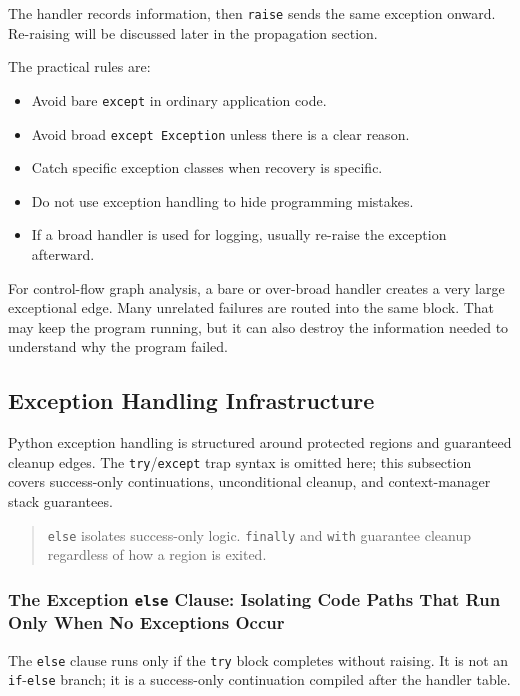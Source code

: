 \documentclass[a4paper,twoside]{report}
\begin{document}
The handler records information, then \texttt{raise} sends the same exception onward. Re-raising will be discussed later in the propagation section.

The practical rules are:

\begin{itemize}
    \item Avoid bare \texttt{except} in ordinary application code.
    \item Avoid broad \texttt{except Exception} unless there is a clear reason.
    \item Catch specific exception classes when recovery is specific.
    \item Do not use exception handling to hide programming mistakes.
    \item If a broad handler is used for logging, usually re-raise the exception afterward.
\end{itemize}

For control-flow graph analysis, a bare or over-broad handler creates a very large exceptional edge. Many unrelated failures are routed into the same block. That may keep the program running, but it can also destroy the information needed to understand why the program failed.

\subsection{Exception Handling Infrastructure}

Python exception handling is structured around protected regions and guaranteed cleanup edges. The \texttt{try}/\texttt{except} trap syntax is omitted here; this subsection covers success-only continuations, unconditional cleanup, and context-manager stack guarantees.

\begin{quote}
\texttt{else} isolates success-only logic. \texttt{finally} and \texttt{with} guarantee cleanup regardless of how a region is exited.
\end{quote}

\subsubsection{The Exception \texttt{else} Clause: Isolating Code Paths That Run Only When No Exceptions Occur}

The \texttt{else} clause runs only if the \texttt{try} block completes without raising. It is not an \texttt{if}-\texttt{else} branch; it is a success-only continuation compiled after the handler table.
\end{document}
